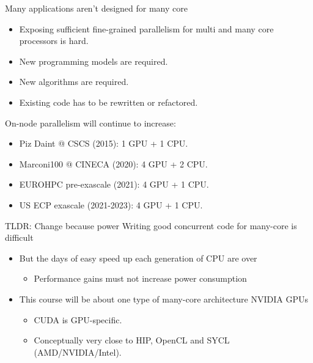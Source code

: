 \documentclass[aspectratio=43]{beamer}
\begin{document}
\begin{frame}[fragile]{Many applications aren't designed for many core}
    \begin{itemize}
        \item Exposing sufficient fine-grained parallelism for multi and many core processors is hard.
        \item New programming models are required.
        \item New algorithms are required.
        \item Existing code has to be rewritten or refactored.
    \end{itemize}

    On-node parallelism will continue to increase:
    \begin{itemize}
        \item Piz Daint @ CSCS (2015): 1 GPU + 1 CPU.
        \item Marconi100 @ CINECA (2020): 4 GPU + 2 CPU.
        \item EUROHPC pre-exascale (2021): 4 GPU + 1 CPU.
        \item US ECP exascale (2021-2023): 4 GPU + 1 CPU.
    \end{itemize}
\end{frame}


\begin{frame}[fragile]{TLDR: Change because power}
    Writing good concurrent code for many-core is difficult
    \begin{itemize}
        \item But the days of easy speed up each generation of CPU are over
        \begin{itemize}
            \item Performance gains must not increase power consumption
        \end{itemize}
        \item This course will be about one type of many-core architecture NVIDIA GPUs
        \begin{itemize}
            \item CUDA is GPU-specific.
            \item Conceptually very close to HIP, OpenCL and SYCL (AMD/NVIDIA/Intel).
        \end{itemize}
    \end{itemize}
\end{frame}
\end{document}
